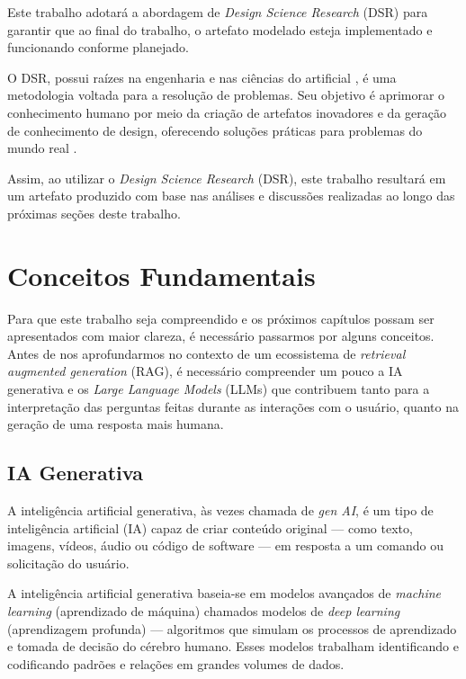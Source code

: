 \documentclass[a4paper, 12pt]{article}
\newcommand{\citeb}[1]{\bibleftbracket\cite{#1}\bibrightbracket}
\begin{document}
    Este trabalho adotará a abordagem de \textit{Design Science Research} (DSR) para garantir que ao final do trabalho, o artefato modelado esteja implementado e funcionando conforme planejado.

    O DSR, possui raízes na engenharia e nas ciências do artificial \citeb{simon_1996}, é uma metodologia voltada para a resolução de problemas. Seu objetivo é aprimorar o conhecimento humano por meio da criação de artefatos inovadores e da geração de conhecimento de design, oferecendo soluções práticas para problemas do mundo real \citeb{design_science}.

    Assim, ao utilizar o \textit{Design Science Research} (DSR), este trabalho resultará em um artefato produzido com base nas análises e discussões realizadas ao longo das próximas seções deste trabalho.
    
    \clearpage

    \section{Conceitos Fundamentais}

    Para que este trabalho seja compreendido e os próximos capítulos possam ser apresentados com maior clareza, é necessário passarmos por alguns conceitos. Antes de nos aprofundarmos no contexto de um ecossistema de \textit{retrieval augmented generation} (RAG), é necessário compreender um pouco a IA generativa e os \textit{Large Language Models} (LLMs) que contribuem tanto para a interpretação das perguntas feitas durante as interações com o usuário, quanto na geração de uma resposta mais humana.
    
    \subsection{IA Generativa}
    
    A inteligência artificial generativa, às vezes chamada de \textit{gen AI}, é um tipo de inteligência artificial (IA) capaz de criar conteúdo original — como texto, imagens, vídeos, áudio ou código de software — em resposta a um comando ou solicitação do usuário. \citeb{genai_ibm}

    A inteligência artificial generativa baseia-se em modelos avançados de \textit{machine learning} (aprendizado de máquina) chamados modelos de \textit{deep learning} (aprendizagem profunda) — algoritmos que simulam os processos de aprendizado e tomada de decisão do cérebro humano. Esses modelos trabalham identificando e codificando padrões e relações em grandes volumes de dados.
\end{document}
